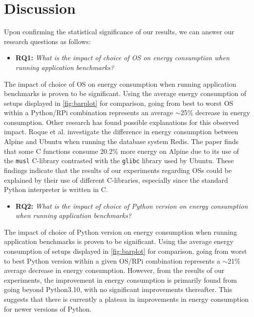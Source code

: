 \section{Discussion}
\label{sec:discussion}
Upon confirming the statistical significance of our results, we can answer our research questions as follows:
\begin{itemize}[label={}]
    \item \textbf{RQ1:} 
    \textit{What is the impact of choice of OS on energy consumption when running application benchmarks?}
\end{itemize}
The impact of choice of OS on energy consumption when running application benchmarks is proven to be significant. Using the average energy consumption of setups displayed in \autoref{fig:barplot} for comparison, going from best to worst OS within a Python/RPi combination represents an average $\sim$25\% decrease in energy consumption. Other research has found possible explanations for this observed impact. Roque et al.\cite{roque2025unveiling} investigate the difference in energy consumption between Alpine and Ubuntu when running the database system Redis. The paper finds that some C functions consume 20.2\% more energy on Alpine due to its use of the \texttt{musl} C-library contrasted with the \texttt{glibc} library used by Ubuntu. These findings indicate that the results of our experiments regarding OSs could be explained by their use of different C-libraries, especially since the standard Python interpreter is written in C.

\begin{itemize}[label={}]
    \item \textbf{RQ2:} 
    \textit{What is the impact of choice of Python version on energy consumption when running application benchmarks?}
\end{itemize}

The impact of choice of Python version on energy consumption when running application benchmarks is proven to be significant. Using the average energy consumption of setups displayed in \autoref{fig:barplot} for comparison, going from worst to best Python version within a given OS/RPi combination represents a $\sim$21\% average decrease in energy consumption. However, from the results of our experiments, the improvement in energy consumption is primarily found from going beyond Python3.10, with no significant improvements thereafter. This suggests that there is currently a plateau in improvements in energy consumption for newer versions of Python.

